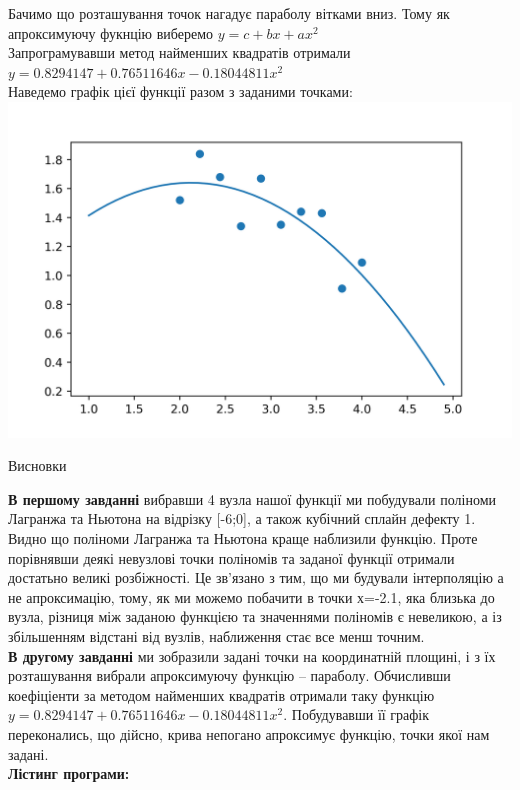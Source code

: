 \documentclass[14 pt]{extarticle}
\begin{document}
Бачимо що розташування точок нагадує параболу вітками вниз. Тому як апроксимуючу фукнцію виберемо $y = c + bx + ax^2$ \\ 
Запрограмувавши метод найменших квадратів отримали \\ 
$y = 0.8294147 +  0.76511646x -0.18044811x^2$ \\ 
Наведемо графік цієї функції разом з заданими точками: \\ 
\includegraphics{plot2.png}
\newpage
\begin{center}
    \Large
    Висновки
\end{center}
\textbf{В першому завданні} вибравши 4 вузла нашої функції ми
 побудували поліноми Лагранжа та Ньютона на відрізку [-6;0], а також кубічний сплайн дефекту 1.\\
Видно що поліноми Лагранжа та Ньютона краще наблизили функцію. Проте порівнявши деякі невузлові
точки поліномів та заданої функції отримали достатьно великі розбіжності. Це зв'язано з тим,
що ми будували інтерполяцію а не апроксимацію, тому, як ми можемо побачити в точки х=-2.1, яка близька 
до вузла, різниця між заданою функцією та значеннями поліномів є невеликою, а із збільшенням 
відстані від вузлів, наближення стає все менш точним. \\ 
\textbf{В другому завданні} ми зобразили задані точки на координатній площині, і з їх
розташування вибрали апроксимуючу функцію -- параболу. Обчисливши коефіціенти за методом
найменших квадратів отримали таку функцію $y = 0.8294147 +  0.76511646x -0.18044811x^2$. 
Побудувавши її графік переконались, що дійсно, крива непогано апроксимує функцію, точки якої нам задані. 
\\ 
\textbf{Лістинг програми:}




\end{document}
